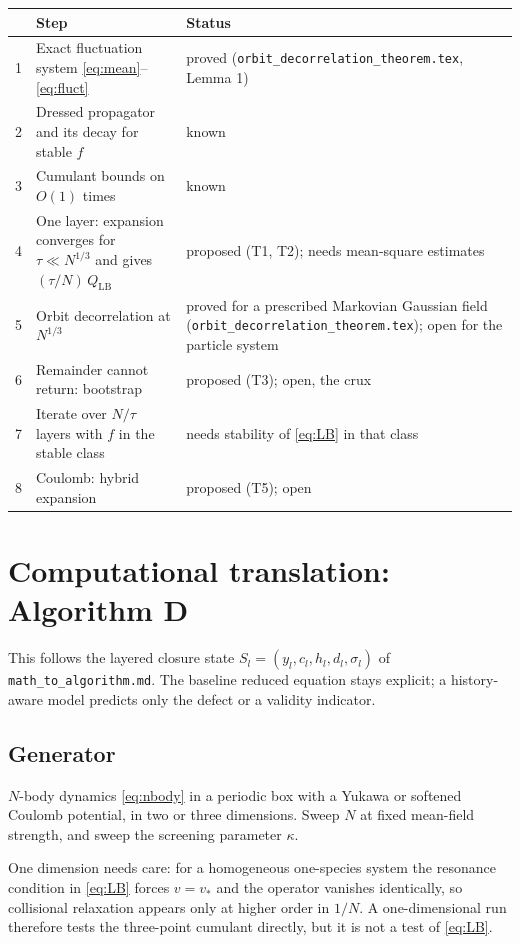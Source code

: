 \documentclass[11pt]{article}
\theoremstyle{definition}
\begin{document}
\begin{center}
\renewcommand{\arraystretch}{1.4}
\begin{tabular}{>{\raggedright}p{0.5cm}>{\raggedright}p{6.6cm}p{6.8cm}}
  & Step & Status \\ \hline
  1 & Exact fluctuation system \eqref{eq:mean}--\eqref{eq:fluct} & proved (\texttt{orbit\_decorrelation\_theorem.tex}, Lemma 1) \\
  2 & Dressed propagator and its decay for stable $f$ & known \\
  3 & Cumulant bounds on $O(1)$ times & known \cite{DuerinckxChaos} \\
  4 & One layer: expansion converges for $\tau\ll N^{1/3}$ and gives
      $(\tau/N)\,Q_{\mathrm{LB}}$ & proposed (T1, T2); needs mean-square
      estimates \\
  5 & Orbit decorrelation at $N^{1/3}$ & proved for a prescribed Markovian Gaussian field (\texttt{orbit\_decorrelation\_theorem.tex}); open for the particle system \\
  6 & Remainder cannot return: bootstrap & proposed (T3); open, the crux \\
  7 & Iterate over $N/\tau$ layers with $f$ in the stable class & needs
      stability of \eqref{eq:LB} in that class \\
  8 & Coulomb: hybrid expansion & proposed (T5); open \\
\end{tabular}
\end{center}

\section{Computational translation: Algorithm D}

This follows the layered closure state $S_l = (y_l, c_l, h_l, d_l,\sigma_l)$
of \texttt{math\_to\_algorithm.md}. The baseline reduced equation stays
explicit; a history-aware model predicts only the defect or a validity
indicator.

\subsection{Generator}

$N$-body dynamics \eqref{eq:nbody} in a periodic box with a Yukawa or
softened Coulomb potential, in two or three dimensions. Sweep $N$ at fixed
mean-field strength, and sweep the screening parameter $\kappa$.

One dimension needs care: for a homogeneous one-species system the
resonance condition in \eqref{eq:LB} forces $v = v_*$ and the operator
vanishes identically, so collisional relaxation appears only at higher order
in $1/N$. A one-dimensional run therefore tests the three-point cumulant
directly, but it is not a test of \eqref{eq:LB}.
\end{document}
